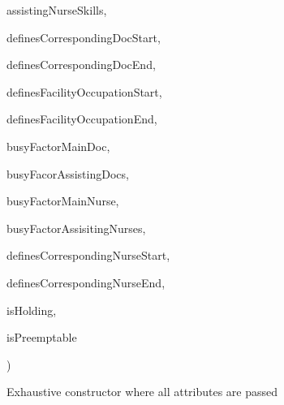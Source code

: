 {\begin{DoxyParamCaption}
\item[{{\bf Skill\+Set}\mbox{[}$\,$\mbox{]}}]{assisting\+Nurse\+Skills, }
\item[{bool}]{defines\+Corresponding\+Doc\+Start, }
\item[{bool}]{defines\+Corresponding\+Doc\+End, }
\item[{bool}]{defines\+Facility\+Occupation\+Start, }
\item[{bool}]{defines\+Facility\+Occupation\+End, }
\item[{double}]{busy\+Factor\+Main\+Doc, }
\item[{double\mbox{[}$\,$\mbox{]}}]{busy\+Facor\+Assisting\+Docs, }
\item[{double}]{busy\+Factor\+Main\+Nurse, }
\item[{double\mbox{[}$\,$\mbox{]}}]{busy\+Factor\+Assisiting\+Nurses, }
\item[{bool}]{defines\+Corresponding\+Nurse\+Start, }
\item[{bool}]{defines\+Corresponding\+Nurse\+End, }
\item[{bool}]{is\+Holding, }
\item[{bool}]{is\+Preemptable}
\end{DoxyParamCaption}
)}\hypertarget{class_general_health_care_elements_1_1_general_classes_1_1_action_types_and_paths_1_1_action_type_class_ab445670b1e664ae8a84416261009453a}{}\label{class_general_health_care_elements_1_1_general_classes_1_1_action_types_and_paths_1_1_action_type_class_ab445670b1e664ae8a84416261009453a}


Exhaustive constructor where all attributes are passed 


